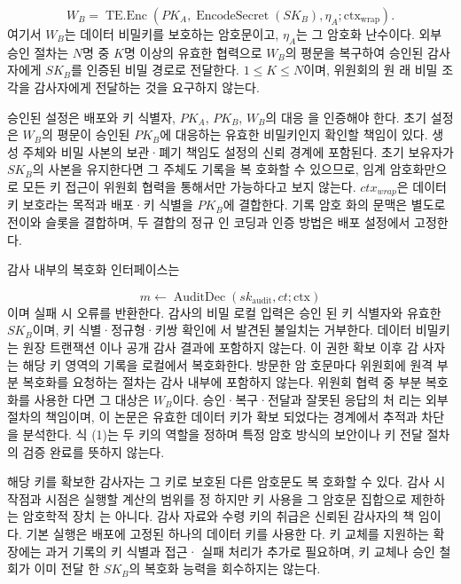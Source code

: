 \begin{equation}
    W_B=\operatorname{TE.Enc}(PK_A,\operatorname{EncodeSecret}(SK_B),\eta_A;\mathrm{ctx}_{\mathrm{wrap}}).\tag{1}
\end{equation}
여기서 \(W_{B}\)는 데이터 비밀키를 보호하는 암호문이고, \(η_{A}\)는 그
암호화 난수이다. 외부 승인 절차는 \(N\)명 중 \(K\)명 이상의 유효한
협력으로 \(W_{B}\)의 평문을 복구하여 승인된 감사자에게 \(SK_{B}\)를
인증된 비밀 경로로 전달한다. \(1≤K≤N\)이며, 위원회의 원
래 비밀 조각을 감사자에게 전달하는 것을 요구하지 않는다.

승인된 설정은 배포와 키 식별자, \(PK_{A}\), \(PK_{B}\), \(W_{B}\)의 대응
을 인증해야 한다. 초기 설정은 \(W_{B}\)의 평문이 승인된 \(PK_{B}\)에
대응하는 유효한 비밀키인지 확인할 책임이 있다. 생성 주체와
비밀 사본의 보관·폐기 책임도 설정의 신뢰 경계에 포함된다.
초기 보유자가 \(SK_{B}\)의 사본을 유지한다면 그 주체도 기록을 복
호화할 수 있으므로, 임계 암호화만으로 모든 키 접근이 위원회
협력을 통해서만 가능하다고 보지 않는다. \(ctx_{wrap}\)은 데이터 키
보호라는 목적과 배포·키 식별을 \(PK_{B}\)에 결합한다. 기록 암호
화의 문맥은 별도로 전이와 슬롯을 결합하며, 두 결합의 정규 인
코딩과 인증 방법은 배포 설정에서 고정한다.

감사 내부의 복호화 인터페이스는

\begin{equation}
    m\leftarrow\operatorname{AuditDec}(sk_{\mathrm{audit}},ct;\mathrm{ctx})\tag{2}
\end{equation}
이며 실패 시 오류를 반환한다. 감사의 비밀 로컬 입력은 승인
된 키 식별자와 유효한 \(SK_{B}\)이며, 키 식별·정규형·키쌍 확인에
서 발견된 불일치는 거부한다. 데이터 비밀키는 원장 트랜잭션
이나 공개 감사 결과에 포함하지 않는다. 이 권한 확보 이후 감
사자는 해당 키 영역의 기록을 로컬에서 복호화한다. 방문한 암
호문마다 위원회에 원격 부분 복호화를 요청하는 절차는 감사
내부에 포함하지 않는다. 위원회 협력 중 부분 복호화를 사용한
다면 그 대상은 \(W_{B}\)이다. 승인·복구·전달과 잘못된 응답의 처
리는 외부 절차의 책임이며, 이 논문은 유효한 데이터 키가 확보
되었다는 경계에서 추적과 차단을 분석한다. 식 (1)는 두 키의
역할을 정하며 특정 암호 방식의 보안이나 키 전달 절차의 검증
완료를 뜻하지 않는다.

해당 키를 확보한 감사자는 그 키로 보호된 다른 암호문도 복
호화할 수 있다. 감사 시작점과 시점은 실행할 계산의 범위를 정
하지만 키 사용을 그 암호문 집합으로 제한하는 암호학적 장치
는 아니다. 감사 자료와 수령 키의 취급은 신뢰된 감사자의 책
임이다. 기본 실행은 배포에 고정된 하나의 데이터 키를 사용한
다. 키 교체를 지원하는 확장에는 과거 기록의 키 식별과 접근·
실패 처리가 추가로 필요하며, 키 교체나 승인 철회가 이미 전달
한 \(SK_{B}\)의 복호화 능력을 회수하지는 않는다.

